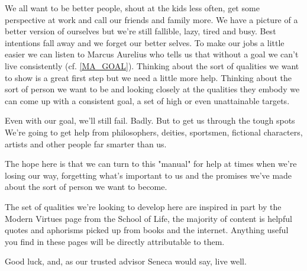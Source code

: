 
\cleardoublepage

\begin{multicols}{2}

We all want to be better people, shout at the kids less often, get some perspective at work and call our friends and family more. We have a picture of a better version of ourselves but we're still fallible, lazy, tired and busy. Best intentions fall away and we forget our better selves. 
To make our jobs a little easier we can listen to Marcus Aurelius who tells us that without a goal we can't live consistently (cf. \ref{MA_GOAL}). Thinking about the sort of qualities we want to show is a great first step but we need a little more help. Thinking about the sort of person we want to be and looking closely at the qualities they embody we can come up with a consistent goal, a set of high or even unattainable targets. 

Even with our goal, we'll still fail. Badly. But to get us through the tough spots We're going to get help from philosophers, deities, sportsmen, fictional characters, artists and other people far smarter than us. 

The hope here is that we can turn to this "manual" for help at times when we're losing our way, forgetting what's important to us and the promises we've made about the sort of person we want to become.

The set of qualities we're looking to develop here are inspired in part by the Modern Virtues page from the School of Life, the majority of content is helpful quotes and aphorisms picked up from books and the internet. Anything useful you find in these pages will be directly attributable to them. 

Good luck, and, as our trusted advisor Seneca would say, live well.

\end{multicols}